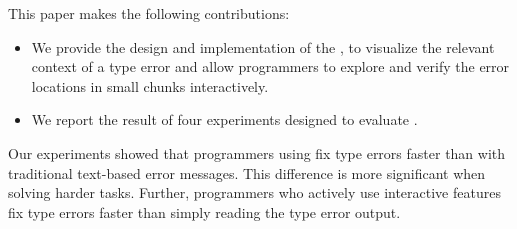 

This paper makes the following contributions:
\begin{itemize}
\item { We provide the design and implementation of the \chameleon{}, to visualize the relevant context of a type error and allow programmers to explore and verify the error locations in small chunks interactively.  }
\item {
    We report the result of four experiments designed to evaluate \chameleon{}.}
\end{itemize}

Our experiments showed that programmers using \chameleon{} fix type errors faster than with traditional text-based error messages. This difference is more significant when solving harder tasks. Further, programmers who actively use \chameleon{} interactive features fix type errors faster than simply reading the type error output.
